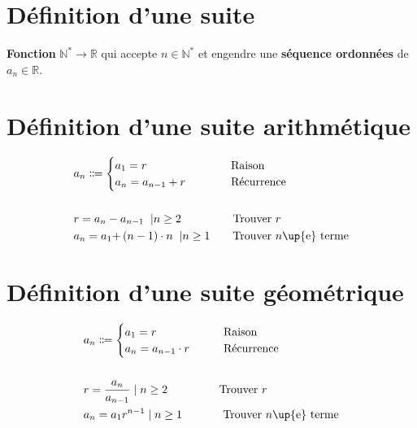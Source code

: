\documentclass{report}
\begin{document}
\begin{multicols*}{3}
    \footnotesize

    \section{Définition d'une suite}
        \textbf{Fonction} $\mathbb{N}^* 
        \rightarrow \mathbb{R}$ qui accepte 
        $n \in \mathbb{N}^*$ et engendre une \textbf{séquence ordonnées} de $a_n \in \mathbb{R}$. 


    \section{Définition d'une suite arithmétique}    
        \begin{align*}
                &a_n \Coloneqq 
                \begin{cases}
                    a_1 = r  &\omit\quad\quad\quad Raison\\  
                    a_{n} = a_{n-1} + r &\omit\hfill \quad\quad\quad Récurrence
                \end{cases}
                \\\\
                &r = a_n - a_{n-1} \;\;| n \geq 2  
                \quad\quad\quad\quad\;\;\text{Trouver $r$} \\
                &a_n = a_1 \text{+} \left(n - 1\right)\cdot{n}  \;\;|n \geq 1  
                \quad\quad\text{Trouver $n$\up{e} terme}
        \end{align*}
    \section{Définition d'une suite géométrique}
        \begin{align*}
                &a_n \Coloneqq 
                \begin{cases}
                    a_1 = r  &\omit\quad\quad Raison\\  
                    a_{n} = a_{n-1} \cdot r &\omit\hfill 
                    \quad\quad Récurrence
                \end{cases}
                \\\\ 
                &r = \frac{a_n}{a_{n-1}} \; | \; n \geq 2
                \quad\quad\quad\quad\;\;\text{Trouver $r$} \\ 
                &a_n = a_1r^{n - 1} \; | \; n \geq 1
                \text{\quad\quad\quad\; Trouver $n$\up{e} terme}
        \end{align*}







\end{multicols*}
\end{document}
